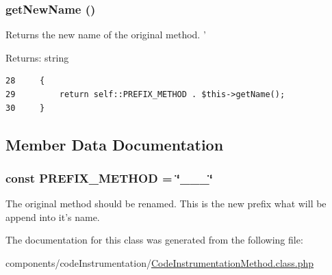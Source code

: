 \hypertarget{class_code_instrumentation_method_6e2855870a7381176413aa24a2fbfd43}{
\subsubsection[{getNewName}]{\setlength{\rightskip}{0pt plus 5cm}getNewName ()}}
\label{class_code_instrumentation_method_6e2855870a7381176413aa24a2fbfd43}


Returns the new name of the original method. ' \begin{Desc}
\item[Returns:]string \end{Desc}


\begin{Code}\begin{verbatim}28     {
29         return self::PREFIX_METHOD . $this->getName();
30     }
\end{verbatim}
\end{Code}




\subsection{Member Data Documentation}
\hypertarget{class_code_instrumentation_method_459af7451a2f181e2e91e444c5a72d04}{
\subsubsection[{PREFIX\_\-METHOD}]{\setlength{\rightskip}{0pt plus 5cm}const {\bf PREFIX\_\-METHOD} = \char`\"{}\_\-\_\-\_\-\char`\"{}}}
\label{class_code_instrumentation_method_459af7451a2f181e2e91e444c5a72d04}


The original method should be renamed. This is the new prefix what will be append into it's name. 

The documentation for this class was generated from the following file:\begin{CompactItemize}
\item 
components/codeInstrumentation/\hyperlink{_code_instrumentation_method_8class_8php}{CodeInstrumentationMethod.class.php}\end{CompactItemize}
